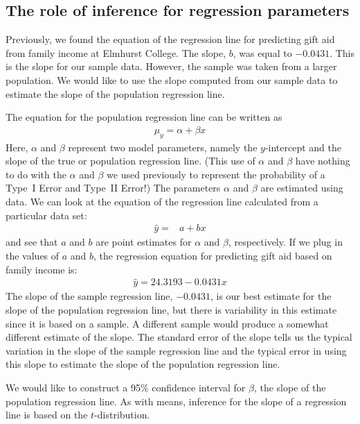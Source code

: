 \subsection{The role of inference for regression parameters}


Previously, we found the equation of the regression line for predicting gift aid from family income at Elmhurst College.  The slope, $b$, was equal to $-0.0431$.  This is the slope for our sample data.  However, the sample was taken from a larger population.   We would like to use the slope computed from our sample data to estimate the slope of the population regression line.

The equation for the population regression line can be written as
\begin{align*}
\mu_y = \alpha + \beta x
\end{align*}
Here, $\alpha$ and $\beta$ represent two model parameters, namely the $y$-intercept and the slope of the true or population regression line. (This use of $\alpha$ and $\beta$ have nothing to do with the $\alpha$ and $\beta$ we used previously to represent the probability of a Type~I Error and Type~II Error!) The parameters $\alpha$ and $\beta$ are estimated using data.  We can look at the equation of the regression line calculated from a particular data set:
\begin{align*}
\hat{y} =& a  + bx 
\end{align*}
and see that $a$ and $b$ are point estimates for $\alpha$ and $\beta$, respectively.  
If we plug in the values of $a$ and $b$, the regression equation for predicting gift aid based on family income is:
\begin{align*}
\hat{y}=24.3193-0.0431x
\end{align*}
The slope of the sample regression line, $-0.0431$, is our best estimate for the slope of the population regression line, but there is variability in this estimate since it is based on a sample.  A different sample would produce a somewhat different estimate of the slope.  The standard error of the slope tells us the typical variation in the slope of the sample regression line and the typical error in using this slope to estimate the slope of the population regression line.  

We would like to construct a 95\% confidence interval for $\beta$, the slope of the population regression line. As with means, inference for the slope of a regression line is based on the $t$-distribution.



